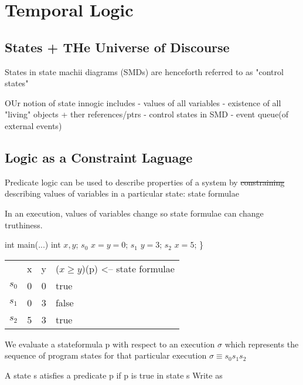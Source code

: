 \documentclass[12pt]{article}
\begin{document}
\section{Temporal Logic}

\subsection{States + THe Universe of Discourse}
States in state machii diagrams (SMDs) are henceforth referred to as "control states"

OUr notion of state innogic includes
- values of all variables
- existence of all "living" objects + ther references/ptrs
- control states in SMD
- event queue(of external events)

\subsection{Logic as a Constraint Laguage}

Predicate logic can be used to describe properties of a system by \sout{constraining} describing values of variables in a particular state: state formulae

In an execution, values of variables change so state formulae can change truthiness.

int main(...)
int $x, y$;
$s_0$    $x=y=0$;
$s_1$    $y=3$;
$s_2$    $x=5$;
\}

\begin{tabular}{c|ccl}
& x & y & ($x \ge y$)(p) <-- state formulae \\
$s_0$ & 0 & 0 & true \\
$s_1$ & 0 & 3 & false \\
$s_2$ & 5 & 3 & true \\
\end{tabular}

We evaluate a stateformula p with respect to an execution $\sigma$ which represents the sequence of program states for that particular execution $\sigma \equiv s_0s_1s_2$

A state s atisfies a predicate p if p is true in state s
Write as
\end{document}
